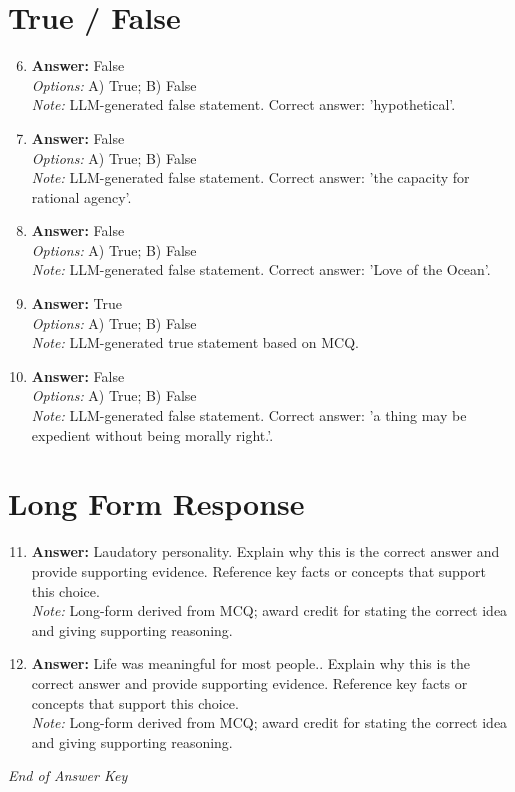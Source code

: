 \documentclass[12pt]{article}
\begin{document}
\section*{True / False}
\begin{enumerate}[label=\arabic*.]
\setcounter{enumi}{5}
\item \textbf{Answer:} False
\\ \textit{Options:} A) True; B) False
\\ \textit{Note:} LLM-generated false statement. Correct answer: 'hypothetical'.
\item \textbf{Answer:} False
\\ \textit{Options:} A) True; B) False
\\ \textit{Note:} LLM-generated false statement. Correct answer: 'the capacity for rational agency'.
\item \textbf{Answer:} False
\\ \textit{Options:} A) True; B) False
\\ \textit{Note:} LLM-generated false statement. Correct answer: 'Love of the Ocean'.
\item \textbf{Answer:} True
\\ \textit{Options:} A) True; B) False
\\ \textit{Note:} LLM-generated true statement based on MCQ.
\item \textbf{Answer:} False
\\ \textit{Options:} A) True; B) False
\\ \textit{Note:} LLM-generated false statement. Correct answer: 'a thing may be expedient without being morally right.'.
\end{enumerate}

\section*{Long Form Response}
\begin{enumerate}[label=\arabic*.]
\setcounter{enumi}{10}
\item \textbf{Answer:} Laudatory personality. Explain why this is the correct answer and provide supporting evidence. Reference key facts or concepts that support this choice.
\\ \textit{Note:} Long-form derived from MCQ; award credit for stating the correct idea and giving supporting reasoning.
\item \textbf{Answer:} Life was meaningful for most people.. Explain why this is the correct answer and provide supporting evidence. Reference key facts or concepts that support this choice.
\\ \textit{Note:} Long-form derived from MCQ; award credit for stating the correct idea and giving supporting reasoning.
\end{enumerate}

\vfill
\noindent\textit{End of Answer Key}
\end{document}
